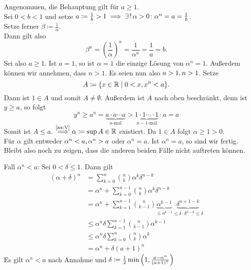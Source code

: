 \documentclass[../ana1.tex]{subfiles}
\begin{document}
\begin{bew}
	Angenommen, die Behauptung gilt für \(a \geq 1 \). \\
	Sei \(0 < b < 1\) und setze \(a \coloneqq \frac{1}{b} > 1 \implies \existse \, \alpha > 0 \colon \alpha^n = a = \frac{1}{b} \). \\
	Setze ferner \(\beta \coloneqq \frac{1}{\alpha}\). \\
	Dann gilt also
	\[ \beta^n = {\left(\frac{1}{\alpha}\right)}^n = \frac{1}{\alpha^n} = \frac{1}{a} = b.\]
	Sei also \(a \geq 1 \). Ist \(a = 1 \), so ist \(\alpha = 1 \) die einzige Lösung von \(\alpha^n = 1 \). Außerdem können wir annehmen, dass \(n > 1 \).
	Es seien nun also \(a > 1 , n > 1 \). Setze
	\[ A \coloneqq \{ x \in \mathbb{R} \; \vert \; 0 < x , x^n< a \}. \]
	Dann ist \(1 \in A \) und somit \(A \neq \emptyset \). Außerdem ist \(A \) nach oben beschränkt, denn ist \(y \geq a\), so folgt
	\[ y^n \geq a^n = \underbrace{a \cdot a \cdots a}_{n\text{-mal}} > \underbrace{1 \cdot 1 \cdots \cdot 1}_{n-1\text{-mal}} \cdot a = a \]
	Somit ist \(A \leq a \). \(\overset{\text{\autoref{ax:V}}}{\implies} \alpha \coloneqq \sup A \in \R \) existiert. Da \(1 \in A \) folgt \(\alpha \geq 1 > 0 \). \\
	Für \(\alpha \) gilt entweder \(\alpha^n <a , \alpha^n > a \) oder \(\alpha^n = a \). Ist \(\alpha^n = a \), so sind wir fertig. Bleibt also noch zu zeigen,
	dass die anderen beiden Fälle nicht auftreten können.
	\begin{faelle}
		\item[Fall \(\alpha^n < a\):] Sei \(0 < \delta \leq 1 \). Dann gilt
			\!\begin{align}
				{(\alpha + \delta)}^n & = \sum_{k=0}^{n} \binom{n}{k} \alpha^k\delta^{n-k} \nonumber \\
								  	  & = \alpha^n + \sum_{k=0}^{n-1} \binom{n}{k} \alpha^k\delta^{n-k} \nonumber \\
									  & = \alpha^n + \sum_{k=1}^{n-1} \binom{n}{k-1} \underbrace{\alpha^{k-1}}_{\leq a^{k-1}}\underbrace{\delta^{n+1-k}}_{\leq \delta \cdot \delta^{n-k} \leq \delta} \nonumber \\
									  & \leq \alpha^n \delta \sum_{k=1}^{n-1} \binom{n}{k-1} \alpha^{k-1} \nonumber \\
									  & \leq \alpha^n \delta \sum_{k=0}^{n} \binom{n}{k} \alpha^{k} \nonumber \\
									  & = \alpha^n + \delta {(a+1)}^n \tag{\textasteriskcentered}
			\end{align}
			Es gilt \(\alpha^n < a\) nach Annahme und \(\delta \coloneqq \frac{1}{2} \min{\left(1 ,\frac{a-\alpha^n}{{(a+1)}^n}\right)} \) \\

\end{faelle}
\end{bew}
\end{document}
